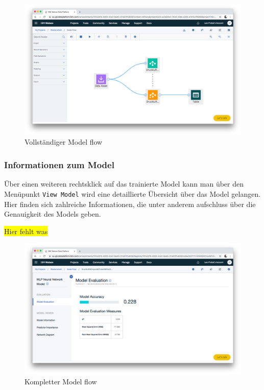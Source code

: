 \begin{figure}[h]
    \centering
    \includegraphics[scale=0.26]{images/kapitel_3/umsetzung_model_flow.png}
    \caption{Vollständiger Model flow}
    \label{fig:umsetzung_model_flow}
\end{figure}

\subsubsection{Informationen zum Model}
Über einen weiteren rechtsklick auf das trainierte Model kann man über den Menüpunkt \texttt{View Model} wird eine
detaillierte Übersicht über das Model gelangen. Hier finden sich zahlreiche Informationen, die unter anderem aufschluss
über die Genauigkeit des Models geben.

\colorbox{yellow}{Hier fehlt was}

\begin{figure}[h]
    \centering
    \includegraphics[scale=0.26]{images/kapitel_3/model_evaluation.png}
    \caption{Kompletter Model flow}
    \label{fig:umsetzung_model_evaluation}
\end{figure}

